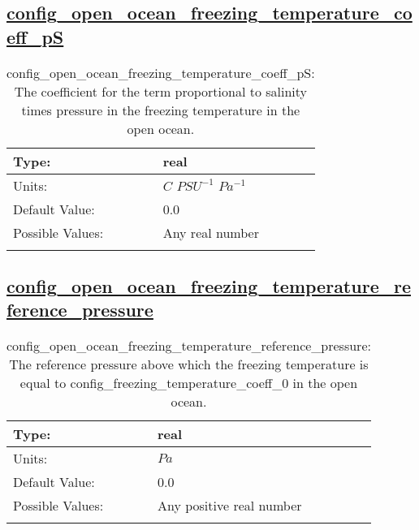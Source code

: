 \subsection[config\_open\_ocean\_freezing\_temperature\_coeff\_pS]{\hyperref[sec:nm_tab_eos]{config\_open\_ocean\_freezing\_temperature\_coeff\_pS}}
\label{subsec:nm_sec_config_open_ocean_freezing_temperature_coeff_pS}
\begin{center}
\begin{longtable}{| p{2.0in} || p{4.0in} |}
    \hline
    Type: & real \\
    \hline
    Units: & $C$ $PSU^{-1}$ $Pa^{-1}$ \\
    \hline
    Default Value: & 0.0 \\
    \hline
    Possible Values: & Any real number \\
    \hline
    \caption{config\_open\_ocean\_freezing\_temperature\_coeff\_pS: The coefficient for the term proportional to salinity times pressure in the freezing temperature in the open ocean.}
\end{longtable}
\end{center}
\subsection[config\_open\_ocean\_freezing\_temperature\_reference\_pressure]{\hyperref[sec:nm_tab_eos]{config\_open\_ocean\_freezing\_temperature\_reference\_pressure}}
\label{subsec:nm_sec_config_open_ocean_freezing_temperature_reference_pressure}
\begin{center}
\begin{longtable}{| p{2.0in} || p{4.0in} |}
    \hline
    Type: & real \\
    \hline
    Units: & $Pa$ \\
    \hline
    Default Value: & 0.0 \\
    \hline
    Possible Values: & Any positive real number \\
    \hline
    \caption{config\_open\_ocean\_freezing\_temperature\_reference\_pressure: The reference pressure above which the freezing temperature is equal to config\_freezing\_temperature\_coeff\_0 in the open ocean.}
\end{longtable}
\end{center}
